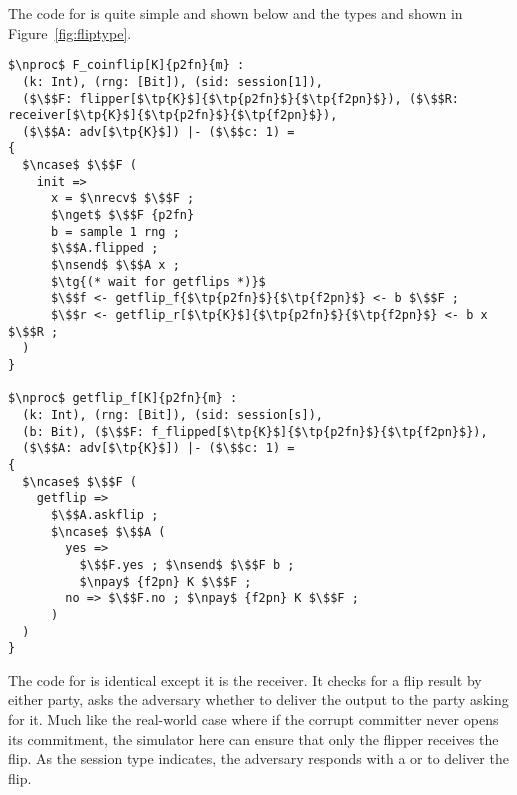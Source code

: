 The code for \Fflip is quite simple and shown below and the types  and  shown in Figure~\ref{fig:fliptype}.
\begin{lstlisting}[basicstyle=\scriptsize\BeraMonottFamily, frame=single, mathescape]
$\nproc$ F_coinflip[K]{p2fn}{m} :
  (k: Int), (rng: [Bit]), (sid: session[1]),
  ($\$$F: flipper[$\tp{K}$]{$\tp{p2fn}$}{$\tp{f2pn}$}), ($\$$R: receiver[$\tp{K}$]{$\tp{p2fn}$}{$\tp{f2pn}$}),
  ($\$$A: adv[$\tp{K}$]) |- ($\$$c: 1) =
{
  $\ncase$ $\$$F (
    init =>
      x = $\nrecv$ $\$$F ;
      $\nget$ $\$$F {p2fn}
      b = sample 1 rng ;
      $\$$A.flipped ;
      $\nsend$ $\$$A x ;
      $\tg{(* wait for getflips *)}$
      $\$$f <- getflip_f{$\tp{p2fn}$}{$\tp{f2pn}$} <- b $\$$F ;
      $\$$r <- getflip_r[$\tp{K}$]{$\tp{p2fn}$}{$\tp{f2pn}$} <- b x $\$$R ;
  )
}

$\nproc$ getflip_f[K]{p2fn}{m} :
  (k: Int), (rng: [Bit]), (sid: session[s]),
  (b: Bit), ($\$$F: f_flipped[$\tp{K}$]{$\tp{p2fn}$}{$\tp{f2pn}$}),
  ($\$$A: adv[$\tp{K}$]) |- ($\$$c: 1) =
{
  $\ncase$ $\$$F (
    getflip =>
      $\$$A.askflip ;
      $\ncase$ $\$$A (
        yes => 
          $\$$F.yes ; $\nsend$ $\$$F b ;
          $\npay$ {f2pn} K $\$$F ;
        no => $\$$F.no ; $\npay$ {f2pn} K $\$$F ;
      )
  )
}
\end{lstlisting}
The code for   is identical except it is the receiver. 
It checks for a flip result by either party, \Fflip asks the adversary whether to deliver the output to the party asking for it.
Much like the real-world case where if the corrupt committer never opens its commitment, the simulator here can ensure that only the flipper receives the flip.
As the session type indicates, the adversary responds with a  or  to deliver the flip.

